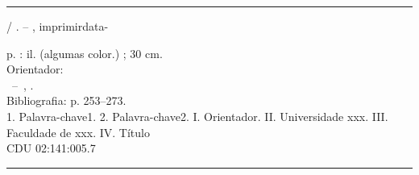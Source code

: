 \thispagestyle{empty}

%
%

% 


{
\vspace*{15cm}					%
\footnotesize					%
\hrule							%
\begin{center}					%
\begin{minipage}[c]{12.5cm}		%
\begin{spacing}{1.0}				%

\imprimirautor

\hspace{0.5cm} \imprimirtitulo  / \imprimirautor. --
\imprimirlocal, imprimirdata-

\hspace{0.5cm} \pageref{LastPage} p. : il. (algumas color.) ; 30 cm.
\\

\hspace{0.5cm} Orientador: \imprimirorientadorConteudo
\\

\hspace{0.5cm} \imprimirtipotrabalho~--~\imprimirinstituicao, \imprimirdata.
\\

\hspace{0.5cm} Bibliografia: p. 253--273.
\\

\hspace{0.5cm}
	1. Palavra-chave1.
	2. Palavra-chave2.
	I. Orientador.
	II. Universidade xxx.
	III. Faculdade de xxx.
	IV. Título 			%
\\

\hspace{8.75cm} CDU 02:141:005.7
\\

\end{spacing}
\end{minipage}
\end{center}
\hrule
}
